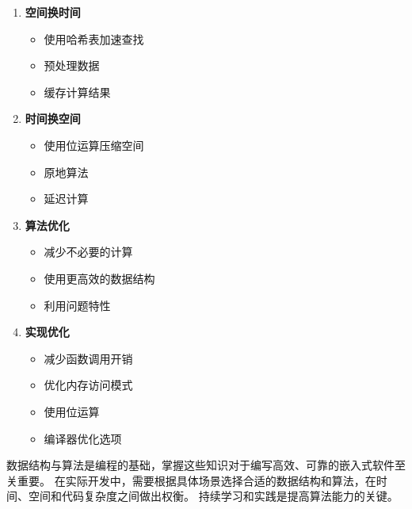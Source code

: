 \begin{enumerate}
  \item \textbf{空间换时间}
    \begin{itemize}
      \item 使用哈希表加速查找
      \item 预处理数据
      \item 缓存计算结果
    \end{itemize}

  \item \textbf{时间换空间}
    \begin{itemize}
      \item 使用位运算压缩空间
      \item 原地算法
      \item 延迟计算
    \end{itemize}

  \item \textbf{算法优化}
    \begin{itemize}
      \item 减少不必要的计算
      \item 使用更高效的数据结构
      \item 利用问题特性
    \end{itemize}

  \item \textbf{实现优化}
    \begin{itemize}
      \item 减少函数调用开销
      \item 优化内存访问模式
      \item 使用位运算
      \item 编译器优化选项
    \end{itemize}
\end{enumerate}

数据结构与算法是编程的基础，掌握这些知识对于编写高效、可靠的嵌入式软件至关重要。
在实际开发中，需要根据具体场景选择合适的数据结构和算法，在时间、空间和代码复杂度之间做出权衡。
持续学习和实践是提高算法能力的关键。
